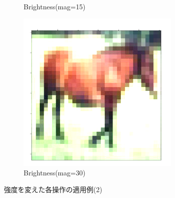 \documentclass[onecolumn]{ujarticle}   %
\begin{document}
\begin{figure}[h]
\begin{subfigure}{0.3\columnwidth}
        \caption{Brightness(mag=15)}
        \label{fig:Brightness_15}
      \end{subfigure}
      \begin{subfigure}{0.3\columnwidth}
        \centering
        \includegraphics[width=1.0\columnwidth]{transform_test/Brightness_30.png}
        \caption{Brightness(mag=30)}
        \label{fig:Brightness_30}
      \end{subfigure}

      \caption{強度を変えた各操作の適用例(2)}
      \label{fig:OperationsWithVariousMagnitude2}
    \end{figure}
\end{document}
